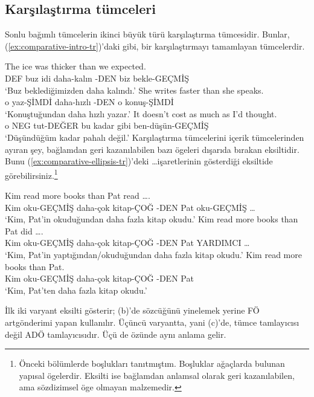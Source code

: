 \subsection{Karşılaştırma tümceleri}

Sonlu bağımlı tümcelerin ikinci büyük türü karşılaştırma tümcesidir. Bunlar, (\ref{ex:comparative-intro-tr})'daki gibi, bir karşılaştırmayı tamamlayan tümcelerdir.

\ea \label{ex:comparative-intro-tr}
    \ea \gll The ice was thicker than {\ob}we expected{\cb}.\\
        DEF buz idi daha-kalın -DEN biz bekle-GEÇMİŞ\\
    \glt `Buz beklediğimizden daha kalındı.'
    \ex \gll She writes faster than {\ob}she speaks{\cb}.\\
        o yaz-ŞİMDİ daha-hızlı -DEN o konuş-ŞİMDİ\\
    \glt `Konuştuğundan daha hızlı yazar.'
    \ex \gll It doesn't cost as much as {\ob}I'd thought{\cb}.\\
        o NEG tut-DEĞER bu kadar gibi ben-düşün-GEÇMİŞ\\
    \glt `Düşündüğüm kadar pahalı değil.'
    \z
\z
Karşılaştırma tümcelerini içerik tümcelerinden ayıran şey, bağlamdan geri kazanılabilen bazı ögeleri dışarıda bırakan eksiltidir. Bunu (\ref{ex:comparative-ellipsis-tr})'deki \dots işaretlerinin gösterdiği eksiltide görebilirsiniz.\footnote{Önceki bölümlerde boşlukları tanıtmıştım. Boşluklar ağaçlarda bulunan yapısal ögelerdir. Eksilti ise bağlamdan anlamsal olarak geri kazanılabilen, ama sözdizimsel öge olmayan malzemedir.}

\ea \label{ex:comparative-ellipsis-tr}
    \ea \gll Kim read more books than {\ob}Pat read \dots{\cb}.\\
        Kim oku-GEÇMİŞ daha-çok kitap-ÇOĞ -DEN Pat oku-GEÇMİŞ \dots\\
    \glt `Kim, Pat'in okuduğundan daha fazla kitap okudu.'
    \ex \gll Kim read more books than {\ob}Pat did \dots{\cb}.\\
        Kim oku-GEÇMİŞ daha-çok kitap-ÇOĞ -DEN Pat YARDIMCI \dots\\
    \glt `Kim, Pat'in yaptığından/okuduğundan daha fazla kitap okudu.'
    \ex \gll Kim read more books than {\ob}Pat{\cb}.\\
        Kim oku-GEÇMİŞ daha-çok kitap-ÇOĞ -DEN Pat\\
    \glt `Kim, Pat'ten daha fazla kitap okudu.'
    \z
\z

İlk iki varyant eksilti gösterir; (b)'de  sözcüğünü yinelemek yerine FÖ artgönderimi yapan  kullanılır. Üçüncü varyantta, yani (c)'de,  tümce tamlayıcısı değil ADÖ tamlayıcısıdır. Üçü de özünde aynı anlama gelir.

